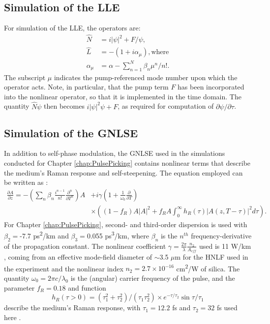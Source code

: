 \subsection{Simulation of the LLE}
For simulation of the LLE, the operators are: 
\begin{align}
\hat{N}&=i|\psi|^2+F/\psi,\\
\hat{L}&=-(1+i\alpha_\mu), \text{where}\\
\alpha_\mu&=\alpha-\sum_{n=1}^N\beta_n\mu^n/n!.
\end{align}
The subscript $\mu$ indicates the pump-referenced mode number upon which the operator acts. Note, in particular, that the pump term $F$ has been incorporated into the nonlinear operator, so that it is implemented in the time domain. The quantity $\hat{N}\psi$ then becomes $i|\psi|^2\psi+F$, as required for computation of $\partial\psi/\partial\tau$.

\subsection{Simulation of the GNLSE}

In addition to self-phase modulation, the GNLSE used in the simulations conducted for Chapter \ref{chap:PulsePicking} contains nonlinear terms that describe the medium's Raman response and self-steepening. The equation employed can be written as \cite{Hult2007,Agrawal2007}:
\begin{align}
\frac{\partial A}{\partial z}=-\left(\sum_n \beta_n \frac{i^{n-1}}{n!} \frac{\partial^n}{\partial T^n}\right)A&+i\gamma\left(1+\frac{1}{\omega_0}\frac{\partial}{\partial T}\right) \nonumber \\
&\times\left((1-f_R)A|A|^2+f_R A\int_0^\infty h_R(\tau)|A(z,T-\tau)|^2 d\tau\right).
\end{align}
For Chapter \ref{chap:PulsePicking}, second- and third-order dispersion is used with $\beta_2=$-7.7 ps\textsuperscript{2}/km and $\beta_3=$0.055 ps\textsuperscript{3}/km, where $\beta_n$ is the $n^{th}$ frequency-derivative of the propagation constant. The nonlinear coefficient $\gamma=\frac{2\pi}{\lambda}\frac{n_2}{A_{eff}}$ used is 11 W/km \cite{Hirano2009}, coming from an effective mode-field diameter of $\sim$3.5 $\mu$m for the HNLF used in the experiment and the nonlinear index $n_2=2.7\times10^{-16}$ cm\textsuperscript{2}/W of silica. The quantity $\omega_0=2\pi c/\lambda_0$ is the (angular) carrier frequency of the pulse, and the parameter $f_R=0.18$ and function
\begin{equation}
h_R(\tau>0)=(\tau_1^2+\tau_2^2)/(\tau_1 \tau_2^2)\times e^{-\tau/\tau_2}\sin{\tau/\tau_1}
\end{equation} 
describe the medium's Raman response, with $\tau_1=12.2$ fs and $\tau_2=32$ fs used here \cite{Agrawal2007,Hult2007,Blow1989}.

